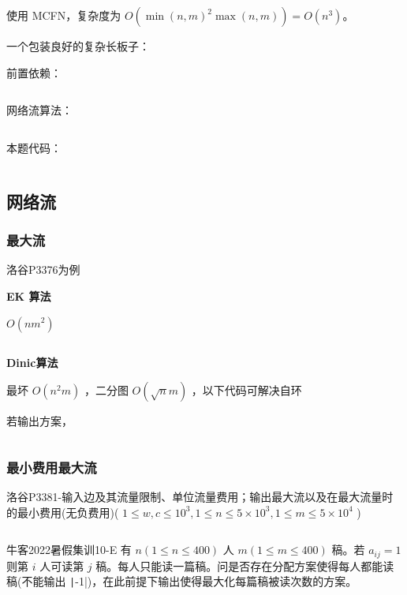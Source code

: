 \documentclass[twocolumn,10pt]{ctexart}
\makeatletter
\newcommand{\hfive}[1]{\par\addvspace{6pt}\@afterindentfalse
  {\noindent\bfseries\normalsize #1}\par\nobreak\vspace{2pt}}
\makeatother
\begin{document}
使用 MCFN，复杂度为 $O(\min(n,m)^2\max(n,m))=O(n^3)$。

一个包装良好的复杂长板子：

\begin{notebox}
前置依赖：

\inputminted{cpp}{code/ext_048.cpp}

网络流算法：

\inputminted{cpp}{code/ext_049.cpp}
\end{notebox}

本题代码：

\inputminted{cpp}{code/ext_050.cpp}

\subsection{网络流}

\subsubsection{最大流}

洛谷P3376为例

\hfive{EK 算法 }

$O(nm^2)$

\inputminted{cpp}{code/p3376_ek.cpp}

\hfive{Dinic算法}

最坏 $O(n^2m)$ ，二分图 $O(\sqrt nm)$ ，以下代码可解决自环

若输出方案，

\inputminted{cpp}{code/ext_051.cpp}

\subsubsection{最小费用最大流}

\begin{notebox}
洛谷P3381-输入边及其流量限制、单位流量费用；输出最大流以及在最大流量时的最小费用(无负费用)( $1\le w,\allowbreak{}c\le10^3,\allowbreak{}1\le n\le5\times10^3,\allowbreak{}1\le m\le5\times10^4$ )
\end{notebox}

\inputminted{cpp}{code/p3381_mcmf.cpp}

\begin{notebox}
牛客2022暑假集训10-E 有 $n(1\le n\le400)$ 人 $m(1\le m\le400)$ 稿。若 $a_{ij}=1$ 则第 $i$ 人可读第 $j$ 稿。每人只能读一篇稿。问是否存在分配方案使得每人都能读稿(不能输出 \texttt|-1|)，在此前提下输出使得最大化每篇稿被读次数的方案。
\end{notebox}
\end{document}
